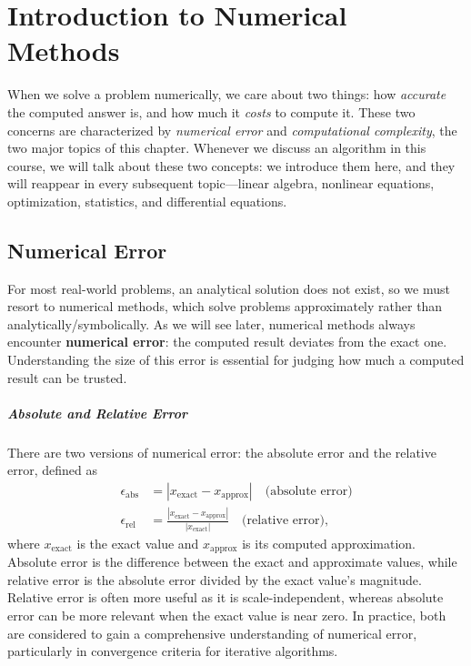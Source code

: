 \chapter{Introduction to Numerical Methods}
When we solve a problem numerically, we care about two things: how \emph{accurate} the computed answer is, and how much it \emph{costs} to compute it.
These two concerns are characterized by \emph{numerical error} and \emph{computational complexity}, the two major topics of this chapter.
Whenever we discuss an algorithm in this course, we will talk about these two concepts: we introduce them here, and they will reappear in every subsequent topic---linear algebra, nonlinear equations, optimization, statistics, and differential equations.

\section{Numerical Error}
For most real-world problems, an analytical solution does not exist, so we must resort to numerical methods, which solve problems approximately rather than analytically/symbolically. As we will see later, numerical methods always encounter \textbf{numerical error}: the computed result deviates from the exact one. Understanding the size of this error is essential for judging how much a computed result can be trusted.

\paragraph*{Absolute and Relative Error}
There are two versions of numerical error: the absolute error and the relative error, defined as
\begin{align*}
    \epsilon_{\text{abs}} &= |x_{\text{exact}} - x_{\text{approx}}| \quad \text{(absolute error)} \\
    \epsilon_{\text{rel}} &= \frac{|x_{\text{exact}} - x_{\text{approx}}|}{|x_{\text{exact}}|} \quad \text{(relative error)},
\end{align*}
where $x_{\text{exact}}$ is the exact value and $x_{\text{approx}}$ is its computed approximation.
Absolute error is the difference between the exact and approximate values, while relative error is the absolute error divided by the exact value's magnitude.
Relative error is often more useful as it is scale-independent, whereas absolute error can be more relevant when the exact value is near zero.
In practice, both are considered to gain a comprehensive understanding of numerical error, particularly in convergence criteria for iterative algorithms.



